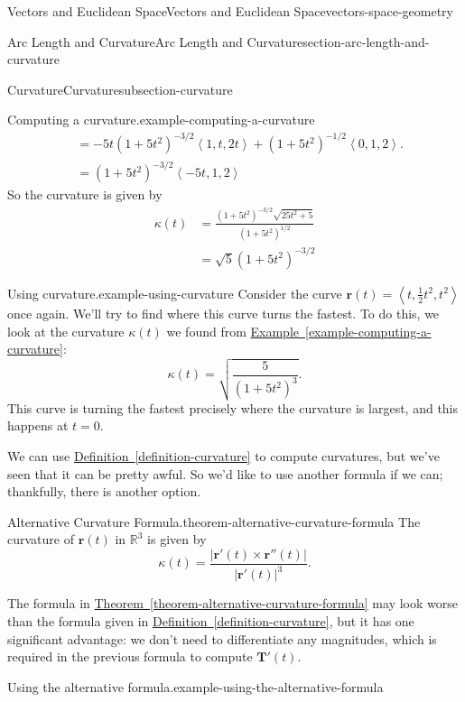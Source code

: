 \documentclass[oneside,10pt,]{book}
\numberwithin{equation}{section}
\newcommand{\RR}{\mathbb{R}}
\newcommand{\vv}[1]{\mathbf{#1}}
\newcommand{\dotprod}[1]{\left\langle #1 \right\rangle}
\begin{document}
\begin{chapterptx}{Vectors and Euclidean Space}{}{Vectors and Euclidean Space}{}{}{vectors-space-geometry}
\begin{sectionptx}{Arc Length and Curvature}{}{Arc Length and Curvature}{}{}{section-arc-length-and-curvature}
\begin{subsectionptx}{Curvature}{}{Curvature}{}{}{subsection-curvature}
\begin{example}{Computing a curvature.}{example-computing-a-curvature}
\begin{align*}
& = -5t(1+5t^{2})^{-3/2}\dotprod{1,t,2t} + (1 + 5t^{2})^{-1/2}\dotprod{0,1,2}. \\
& = (1+5t^{2})^{-3/2}\dotprod{-5t,1,2} 
\end{align*}
\hypertarget{p-1290}{}%
So the curvature is given by%
%
\begin{align*}
\kappa(t) & = \frac{(1+5t^{2})^{-3/2}\sqrt{25t^{2}+5}}{(1+5t^{2})^{1/2}} \\
& = \sqrt{5}(1+5t^{2})^{-3/2} 
\end{align*}
\end{example}
\begin{example}{Using curvature.}{example-using-curvature}%
\hypertarget{p-1291}{}%
Consider the curve \(\vv{r}(t) = \dotprod{t,\frac{1}{2}t^{2},t^{2}}\) once again. We'll try to find where this curve turns the fastest. To do this, we look at the curvature \(\kappa(t)\) we found from \hyperref[example-computing-a-curvature]{Example~\ref{example-computing-a-curvature}}:%
%
\begin{equation*}
\kappa(t) = \sqrt{\frac{5}{(1+5t^{2})^{3}}}.
\end{equation*}
\hypertarget{p-1292}{}%
This curve is turning the fastest precisely where the curvature is largest, and this happens at \(t=0\).%
\end{example}
\hypertarget{p-1293}{}%
We can use \hyperref[definition-curvature]{Definition~\ref{definition-curvature}} to compute curvatures, but we've seen that it can be pretty awful. So we'd like to use another formula if we can; thankfully, there is another option.%
\begin{theorem}{Alternative Curvature Formula.}{}{theorem-alternative-curvature-formula}%
\hypertarget{p-1294}{}%
The curvature of \(\vv{r}(t)\) in \(\RR^{3}\) is given by%
%
\begin{equation*}
\kappa(t) = \frac{|\vv{r}'(t)\times\vv{r}''(t)|}{|\vv{r}'(t)|^{3}}.
\end{equation*}
\end{theorem}
\hypertarget{p-1295}{}%
The formula in \hyperref[theorem-alternative-curvature-formula]{Theorem~\ref{theorem-alternative-curvature-formula}} may look worse than the formula given in \hyperref[definition-curvature]{Definition~\ref{definition-curvature}}, but it has one significant advantage: we don't need to differentiate any magnitudes, which is required in the previous formula to compute \(\vv{T}'(t)\).%
\begin{example}{Using the alternative formula.}{example-using-the-alternative-formula}%

\end{example}
\end{subsectionptx}
\end{sectionptx}
\end{chapterptx}
\end{document}
